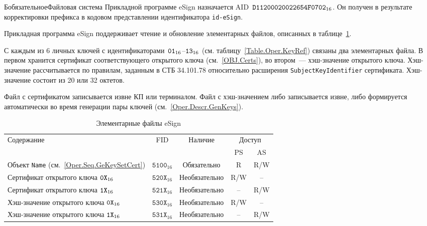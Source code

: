 \begin{appendix}{Б}{обязательное}{Файловая система}
Прикладной программе eSign назначается AID~$\texttt{D11200020022654F0702}_{16}$. 
Он получен в результате корректировки префикса в кодовом представлении 
идентификатора \verb|id-eSign|.

Прикладная программа eSign поддерживает чтение и обновление 
элементарных файлов, описанных в таблице~\ref{Table.FILES.EFSIGN}.

С каждым из 6 личных ключей с идентификаторами~$\texttt{01}_{16}$--$\texttt{13}_{16}$
(см. таблицу~\ref{Table.Oper.KeyRef}) связаны два элементарных
файла. В первом хранится сертификат соответствующего открытого ключа 
(см.~\ref{OBJ.Certs}), во втором~--- хэш-значение открытого ключа.
%
Хэш-значение рассчитывается по правилам, заданным в СТБ 34.101.78
относительно расширения \texttt{SubjectKeyIdentifier} сертификата.
%
Хэш-значение состоит из 20 или 32 октетов.

Файл с сертификатом записывается извне КП или терминалом.
Файл с хэш-значением либо записывается извне, либо формируется 
автоматически во время генерации пары ключей 
(см.~\ref{Oper.Descr.GenKeys}).

\begin{table}[H]
\caption{Элементарные файлы eSign}
\label{Table.FILES.EFSIGN}
\begin{tabular}{|l|c|c|c|c|}
\hline
Содержание & FID & Наличие & \multicolumn{2}{|c|}{Доступ}\\
\cline{4-5}
& & & PS & AS \\
\hline
\hline
Объект \texttt{Name} (см.~\ref{Oper.Seq.GeKeySetCert}) & 
$\texttt{5100}_{16}$ & Обязательно &  R & R/W \\
Сертификат открытого ключа $\texttt{0X}_{16}$ & 
$\texttt{520X}_{16}$ & Необязательно & R/W & -- \\
Сертификат открытого ключа $\texttt{1X}_{16}$ & 
$\texttt{521X}_{16}$ & Необязательно & -- & R/W \\
Хэш-значение открытого ключа $\texttt{0X}_{16}$ & 
$\texttt{530X}_{16}$ & Необязательно & R/W & -- \\
Хэш-значение открытого ключа $\texttt{1X}_{16}$ & 
$\texttt{531X}_{16}$ & Необязательно & -- & R/W \\
\hline
\end{tabular}
\end{table}






\end{appendix}